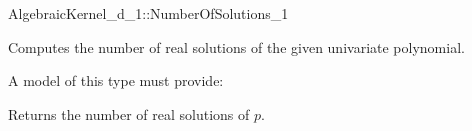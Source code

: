 \begin{ccRefFunctionObjectConcept}{AlgebraicKernel_d_1::NumberOfSolutions_1}

\ccDefinition
Computes the number of real solutions of the given univariate polynomial. 
 
\ccRefines 
{}

\ccTypes
\ccGlue
{}

A model of this type must provide:

\ccOperations
{}

{Returns the number of real solutions of $p$.
}

\ccSeeAlso
{}\\

\end{ccRefFunctionObjectConcept} 